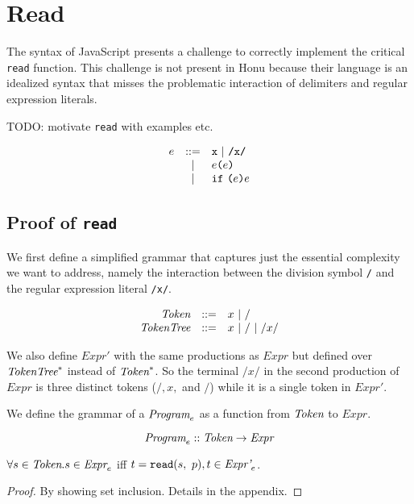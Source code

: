 \documentclass[preprint,10pt]{sigplanconf}
\begin{document}
\section{Read}
\label{sec-3}

The syntax of JavaScript presents a challenge to correctly implement
the critical \texttt{read} function. This challenge is not present in Honu
because their language is an idealized syntax that misses the
problematic interaction of delimiters and regular expression literals.

TODO: motivate \texttt{read} with examples etc.

\[
\begin{array}{rcl}
  e &::=& \texttt{x} ~|~ \texttt{/x/} \\
  &|& e \texttt{(}e\texttt{)} \\
  &|& \texttt{if}~\texttt{(}e\texttt{)}e
\end{array}
\]

\subsection{Proof of \texttt{read}}
\label{sec-3-1}

We first define a simplified grammar that captures just the essential
complexity we want to address, namely the interaction between
the division symbol \texttt{/} and the regular expression literal
\texttt{/x/}.

\[
\begin{array}{rrl}
  \textit{Token} &::=& x ~|~ /
  \\
  \textit{TokenTree} &::=& x ~|~ / ~|~ /x/
  \\
\end{array}
\]

We also define \( \textit{Expr}' \) with the same productions as \(
\textit{Expr} \) but defined over \( \textit{TokenTree}^{*} \) instead of \( \textit{Token}^{*}
\). So the terminal \( /x/ \) in the second production of \(
\textit{Expr} \) is three distinct tokens (\( /, x, \) and \( /
\)) while it is a single token in \( \textit{Expr}' \).

We define the grammar of a \( \textit{Program}_{e} \) as a function from
\( \textit{Token} \) to \( \textit{Expr} \).

\[
\textit{Program}_{e} :: \textit{Token} \rightarrow \textit{Expr}
\]

\begin{theorem}\mbox{}

  \( \forall s \in \textit{Token}. s \in \textit{Expr}_{e} \) iff
  \( t = \texttt{read}(s,~p), t \in \textit{Expr'}_{e} \).
  
\end{theorem}
\begin{proof}\mbox{}
  
By showing set inclusion. Details in the appendix.
\end{proof}
\end{document}
